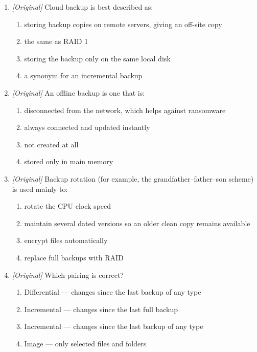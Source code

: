 \documentclass[11pt]{article}
\begin{document}
\begin{enumerate}[label=\textbf{Q\arabic*.}, leftmargin=*]
\item \textit{[Original]} Cloud backup is best described as:
  \begin{enumerate}[label=\Alph*.]
    \item storing backup copies on remote servers, giving an off-site copy
    \item the same as RAID 1
    \item storing the backup only on the same local disk
    \item a synonym for an incremental backup
  \end{enumerate}
\item \textit{[Original]} An offline backup is one that is:
  \begin{enumerate}[label=\Alph*.]
    \item disconnected from the network, which helps against ransomware
    \item always connected and updated instantly
    \item not created at all
    \item stored only in main memory
  \end{enumerate}
\item \textit{[Original]} Backup rotation (for example, the
  grandfather--father--son scheme) is used mainly to:
  \begin{enumerate}[label=\Alph*.]
    \item rotate the CPU clock speed
    \item maintain several dated versions so an older clean copy remains
      available
    \item encrypt files automatically
    \item replace full backups with RAID
  \end{enumerate}
\item \textit{[Original]} Which pairing is correct?
  \begin{enumerate}[label=\Alph*.]
    \item Differential --- changes since the last backup of any type
    \item Incremental --- changes since the last full backup
    \item Incremental --- changes since the last backup of any type
    \item Image --- only selected files and folders
  \end{enumerate}


\end{enumerate}
\end{document}
